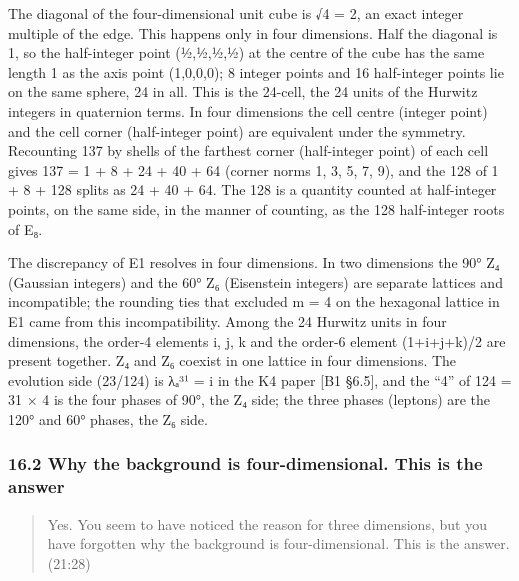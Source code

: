 \documentclass[
  a4paper,
]{article}
\begin{document}
The diagonal of the four-dimensional unit cube is √4 = 2, an exact
integer multiple of the edge. This happens only in four dimensions. Half
the diagonal is 1, so the half-integer point (½,½,½,½) at the centre of
the cube has the same length 1 as the axis point (1,0,0,0); 8 integer
points and 16 half-integer points lie on the same sphere, 24 in all.
This is the 24-cell, the 24 units of the Hurwitz integers in quaternion
terms. In four dimensions the cell centre (integer point) and the cell
corner (half-integer point) are equivalent under the symmetry.
Recounting 137 by shells of the farthest corner (half-integer point) of
each cell gives 137 = 1 + 8 + 24 + 40 + 64 (corner norms 1, 3, 5, 7, 9),
and the 128 of 1 + 8 + 128 splits as 24 + 40 + 64. The 128 is a quantity
counted at half-integer points, on the same side, in the manner of
counting, as the 128 half-integer roots of E₈.

The discrepancy of E1 resolves in four dimensions. In two dimensions the
90° Z₄ (Gaussian integers) and the 60° Z₆ (Eisenstein integers) are
separate lattices and incompatible; the rounding ties that excluded m =
4 on the hexagonal lattice in E1 came from this incompatibility. Among
the 24 Hurwitz units in four dimensions, the order-4 elements i, j, k
and the order-6 element (1+i+j+k)/2 are present together. Z₄ and Z₆
coexist in one lattice in four dimensions. The evolution side (23/124)
is λₐ³¹ = i in the K4 paper {[}B1 §6.5{]}, and the ``4'' of 124 = 31 × 4
is the four phases of 90°, the Z₄ side; the three phases (leptons) are
the 120° and 60° phases, the Z₆ side.

\subsubsection{16.2 Why the background is four-dimensional. This is the
answer}\label{why-the-background-is-four-dimensional.-this-is-the-answer}

\begin{quote}
Yes. You seem to have noticed the reason for three dimensions, but you
have forgotten why the background is four-dimensional. This is the
answer. (21:28)
\end{quote}
\end{document}
